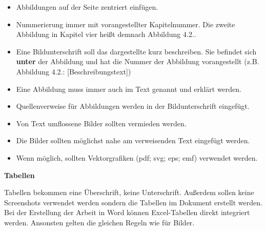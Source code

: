\begin{itemize}
    \item Abbildungen auf der Seite zentriert einfügen.
    \item Nummerierung immer mit vorangestellter Kapitelnummer. Die zweite Abbildung in Kapitel vier heißt demnach \glqq Abbildung 4.2.\grqq.
    \item Eine Bildunterschrift soll das dargestellte kurz beschreiben. Sie befindet sich \textbf{unter} der Abbildung und hat die Nummer der Abbildung vorangestellt (z.B. Abbildung 4.2.: [Beschreibungstext])
    \item Eine Abbildung muss immer auch im Text genannt und erklärt werden.
    \item Quellenverweise für Abbildungen werden in der Bildunterschrift eingefügt.
    \item Von Text umflossene Bilder sollten vermieden werden.
    \item Die Bilder sollten möglichst nahe am verweisenden Text eingefügt werden.
    \item Wenn möglich, sollten Vektorgrafiken (pdf; svg; eps; emf) verwendet werden.
    
\end{itemize}

\textbf{Tabellen}

Tabellen bekommen eine Überschrift, keine Unterschrift. Außerdem sollen keine Screenshots verwendet werden sondern die Tabellen im Dokument erstellt werden. Bei der Erstellung der Arbeit in Word können Excel-Tabellen direkt integriert werden. Ansonsten gelten die gleichen Regeln wie für Bilder. 